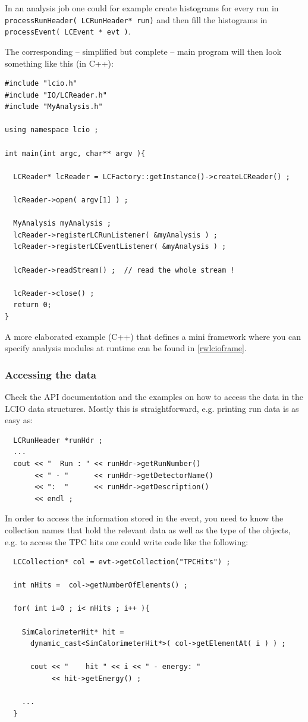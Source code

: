 \documentclass[twoside]{article}
\begin{document}
In an analysis job one could for example create histograms for every run in \\
\verb$processRunHeader( LCRunHeader* run)$
and then fill the histograms in \verb$processEvent( LCEvent * evt )$.

The corresponding -- simplified but complete -- main program will then look something 
like this (in C++):

\begin{verbatim}
#include "lcio.h"
#include "IO/LCReader.h"
#include "MyAnalysis.h"

using namespace lcio ;

int main(int argc, char** argv ){

  LCReader* lcReader = LCFactory::getInstance()->createLCReader() ;
  
  lcReader->open( argv[1] ) ;

  MyAnalysis myAnalysis ;
  lcReader->registerLCRunListener( &myAnalysis ) ;
  lcReader->registerLCEventListener( &myAnalysis ) ;

  lcReader->readStream() ;  // read the whole stream !

  lcReader->close() ;
  return 0;
}
\end{verbatim}

A more elaborated example (C++) that defines a mini framework where you can specify analysis modules at 
runtime can be found in \ref{rwlcioframe}.

\subsubsection{Accessing the data}
Check the API documentation and the examples on how to access the data in the LCIO data structures.
Mostly this is straightforward, e.g. printing run data is as easy as:

\begin{verbatim}
  LCRunHeader *runHdr ;
  ...  
  cout << "  Run : " << runHdr->getRunNumber() 
       << " - "      << runHdr->getDetectorName() 
       << ":  "      << runHdr->getDescription()  
       << endl ;
\end{verbatim}

In order to access the information stored in the event, you need to know the collection names that 
hold the relevant data as well as the type of the objects, e.g. to access the TPC hits one could 
write code like the following:

\begin{verbatim}
  LCCollection* col = evt->getCollection("TPCHits") ;

  int nHits =  col->getNumberOfElements() ;

  for( int i=0 ; i< nHits ; i++ ){

    SimCalorimeterHit* hit = 
      dynamic_cast<SimCalorimeterHit*>( col->getElementAt( i ) ) ;

      cout << "    hit " << i << " - energy: "  
           << hit->getEnergy() ;

    ...
  }
\end{verbatim}
\end{document}
